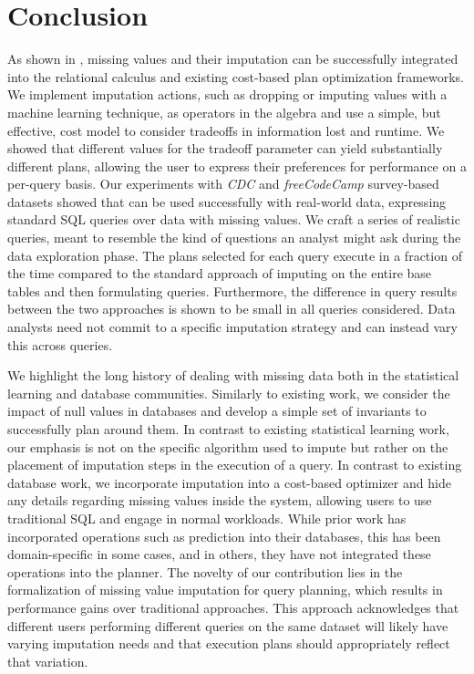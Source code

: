 \section{Conclusion}
As shown in \ProjectName{}, missing values and their imputation can be successfully integrated into the relational calculus and
existing cost-based plan optimization frameworks. We implement imputation actions, such as dropping or imputing values with a machine
learning technique, as operators in the algebra and use a simple, but effective, cost model to consider tradeoffs in 
information lost and runtime. We showed that different values for the tradeoff parameter can yield substantially
different plans, allowing the user to express their preferences for performance on a per-query basis.
Our experiments with \textit{CDC} and \textit{freeCodeCamp} survey-based datasets
showed that \ProjectName{} can be used successfully with real-world data, expressing standard SQL queries over data with missing values. 
We craft a series of realistic queries, meant to resemble the kind of questions an analyst might ask during
the data exploration phase. The plans selected for each query execute in a fraction of the time compared to the standard approach of imputing on the entire base tables and
then formulating queries. Furthermore, the difference in query results between the two approaches is
shown to be small in all queries considered. Data analysts need not commit to a specific imputation strategy and can instead
vary this across queries.

We highlight the long history of dealing with missing data both in the statistical learning and database communities.
Similarly to existing work, we consider the impact of null values in databases and develop a simple set of invariants to 
successfully plan around them. In contrast to existing statistical learning work, our emphasis is not on the specific algorithm
used to impute but rather on the placement of imputation steps in the execution of a query. In contrast to existing database work,
we incorporate imputation into a cost-based optimizer and hide any details
regarding missing values inside the system, allowing users to use traditional SQL and engage in normal workloads.
While prior work has incorporated operations such as prediction into their databases, this has been domain-specific
in some cases, and in others, they have not integrated these operations into the planner. The novelty
of our contribution lies in the formalization of missing value imputation for query planning, which results in performance
gains over traditional approaches. This approach acknowledges that different users performing different queries on the same
dataset will likely have varying imputation needs and that execution plans should appropriately reflect that variation.

